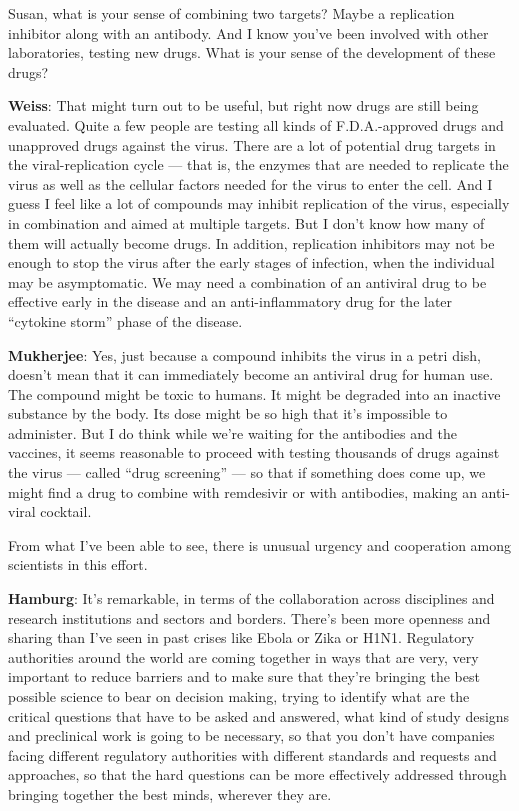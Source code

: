 Susan, what is your sense of combining two targets? Maybe a replication
inhibitor along with an antibody. And I know you've been involved with
other laboratories, testing new drugs. What is your sense of the
development of these drugs?

\textbf{Weiss}: That might turn out to be useful, but right now drugs
are still being evaluated. Quite a few people are testing all kinds of
F.D.A.-approved drugs and unapproved drugs against the virus. There are
a lot of potential drug targets in the viral-replication cycle --- that
is, the enzymes that are needed to replicate the virus as well as the
cellular factors needed for the virus to enter the cell. And I guess I
feel like a lot of compounds may inhibit replication of the virus,
especially in combination and aimed at multiple targets. But I don't
know how many of them will actually become drugs. In addition,
replication inhibitors may not be enough to stop the virus after the
early stages of infection, when the individual may be asymptomatic. We
may need a combination of an antiviral drug to be effective early in the
disease and an anti-inflammatory drug for the later ``cytokine storm''
phase of the disease.

\textbf{Mukherjee}: Yes, just because a compound inhibits the virus in a
petri dish, doesn't mean that it can immediately become an antiviral
drug for human use. The compound might be toxic to humans. It might be
degraded into an inactive substance by the body. Its dose might be so
high that it's impossible to administer. But I do think while we're
waiting for the antibodies and the vaccines, it seems reasonable to
proceed with testing thousands of drugs against the virus --- called
``drug screening'' --- so that if something does come up, we might find
a drug to combine with remdesivir or with antibodies, making an
anti-viral cocktail.

From what I've been able to see, there is unusual urgency and
cooperation among scientists in this effort.

\textbf{Hamburg}: It's remarkable, in terms of the collaboration across
disciplines and research institutions and sectors and borders. There's
been more openness and sharing than I've seen in past crises like Ebola
or Zika or H1N1. Regulatory authorities around the world are coming
together in ways that are very, very important to reduce barriers and to
make sure that they're bringing the best possible science to bear on
decision making, trying to identify what are the critical questions that
have to be asked and answered, what kind of study designs and
preclinical work is going to be necessary, so that you don't have
companies facing different regulatory authorities with different
standards and requests and approaches, so that the hard questions can be
more effectively addressed through bringing together the best minds,
wherever they are.

